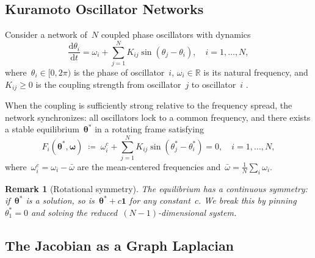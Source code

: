 \documentclass[11pt,a4paper]{article}
\newtheorem{remark}[theorem]{Remark}
\newcommand{\R}{\mathbb{R}}
\newcommand{\dd}{\mathrm{d}}
\newcommand{\thetastar}{\bm{\theta}^*}
\newcommand{\bomega}{\bm{\omega}}
\begin{document}
\subsection{Kuramoto Oscillator Networks}
\label{sec:kuramoto}

Consider a network of~$N$ coupled phase oscillators with dynamics
\begin{equation}
  \frac{\dd \theta_i}{\dd t}
  = \omega_i + \sum_{j=1}^{N} K_{ij} \sin(\theta_j - \theta_i),
  \quad i = 1, \dots, N,
  \label{eq:kuramoto}
\end{equation}
where~$\theta_i \in [0, 2\pi)$ is the phase of oscillator~$i$,
$\omega_i \in \R$ is its natural frequency, and~$K_{ij} \geq 0$ is the
coupling strength from oscillator~$j$ to oscillator~$i$
\citep{kuramoto1984chemical, strogatz2000kuramoto}.

When the coupling is sufficiently strong relative to the frequency spread,
the network synchronizes: all oscillators lock to a common frequency, and
there exists a stable equilibrium~$\thetastar$ in a rotating frame satisfying
\begin{equation}
  F_i(\thetastar, \bomega)
  \;\coloneqq\;
  \omega_i^c + \sum_{j=1}^{N} K_{ij} \sin(\theta_j^* - \theta_i^*)
  = 0,
  \quad i = 1, \dots, N,
  \label{eq:equilibrium}
\end{equation}
where~$\omega_i^c = \omega_i - \bar{\omega}$ are the mean-centered
frequencies and~$\bar{\omega} = \frac{1}{N}\sum_i \omega_i$.

\begin{remark}[Rotational symmetry]
  \label{rem:symmetry}
  The equilibrium has a continuous symmetry: if~$\thetastar$ is a
  solution, so is~$\thetastar + c\mathbf{1}$ for any constant~$c$. We
  break this by pinning~$\theta_1^* = 0$ and solving the
  reduced~$(N{-}1)$-dimensional system.
\end{remark}

\subsection{The Jacobian as a Graph Laplacian}
\label{sec:jacobian}
\end{document}
